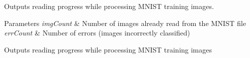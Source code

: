 Outputs reading progress while processing M\+N\+I\+S\+T training images. 


\begin{DoxyParams}{Parameters}
{\em img\+Count} & Number of images already read from the M\+N\+I\+S\+T file \\
\hline
{\em err\+Count} & Number of errors (images incorrectly classified)\\
\hline
\end{DoxyParams}
Outputs reading progress while processing M\+N\+I\+S\+T training images 